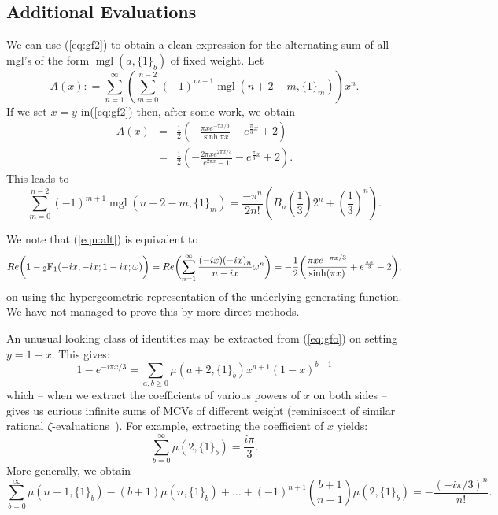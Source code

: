 \documentclass[a4paper,a4paper]{article}
\newcommand{\mgl}{\operatorname{mgl}}
\begin{document}
\subsection{Additional Evaluations}

We can use (\ref{eq:gf2}) to obtain a clean expression for the alternating
sum of
all mgl's of the form $\mgl(a, \{ 1 \}_b)$ of fixed weight.
Let
$$ A(x): = \sum_{n=1}^\infty \left( \sum_{m=0}^{n-2} (-1)^{m+1}
\mgl(n+2 -m, \{ 1 \}_m) \right) x^n .
$$
If we  set $ x = y $ in(\ref{eq:gf2}) then, after some work, we obtain
\begin{eqnarray*}
A(x) &=& \frac{1}{2}\left( -\frac{\pi x e^{-\pi x/3}}{\sinh \pi x}
- e^{\frac{\pi}{3}x} + 2 \right) \\
&=&\frac{1}{2}\left( -\frac{2 \pi x e^{2\pi x/3}}{e^{2 \pi x} -1} -
 e^{\frac{\pi}{3}x} + 2 \right).
\end{eqnarray*}
This leads to
\begin{equation}\label{eqn:alt}
 \sum_{m=0}^{n-2} (-1)^{m+1} \mgl(n+2 -m, \{ 1 \}_m)
= \frac{-\pi^n}{2n!} \left( B_n \left( \frac{1}{3} \right) 2^n +
\left( \frac{1}{3} \right)^n \right).
\end{equation}

We note that
(\ref{eqn:alt}) is equivalent to
$$
Re \biggl( 1 - {}_2\mathrm{F}_1(-ix, -ix; 1 - ix; \omega) \biggr)
=\\
 Re \biggl( \sum_{n=1}^\infty \frac{(-ix)(-ix)_n}{n - ix} \omega^n \biggr)
  = - \frac{1}{2} \biggl( \frac{\pi x e^{-\pi x/3}}{\sinh (\pi x)}
   + e^{\frac{\pi x}{3}} - 2 \biggr),
$$
on using the hypergeometric representation of the underlying generating
function.
We have not managed to prove this by more direct methods.

\vspace{\baselineskip}

An unusual looking class of identities may be extracted from (\ref{eq:gfo})
 on setting $ y = 1 - x $.  This gives:
$$
1 - e^{-i\pi x /3} = \sum_{a,b \ge 0} \mu(a + 2, \{1 \}_b) x^{a+1}
(1-x)^{b+1}
$$
which -- when we extract the coefficients of various powers of
 $ x $ on both sides -- gives us curious infinite sums of MCVs of
 different weight
 (reminiscent of similar rational $\zeta$-evaluations~\cite{BBC}).
For example, extracting the coefficient of $ x $ yields:
$$
\sum_{b=0}^\infty \mu(2, \{ 1 \}_b) = \frac{i \pi}{3}.
$$
More generally,  we obtain
$$
\sum_{b=0}^\infty \mu(n+1, \{ 1 \}_b)
 - (b+1)\mu(n, \{ 1 \}_b)
 + \dots + (-1)^{n+1} {b + 1 \choose n - 1} \mu(2, \{ 1 \}_b)
 =-\frac{(-i \pi/3)^n}{n!}.
$$
\end{document}
